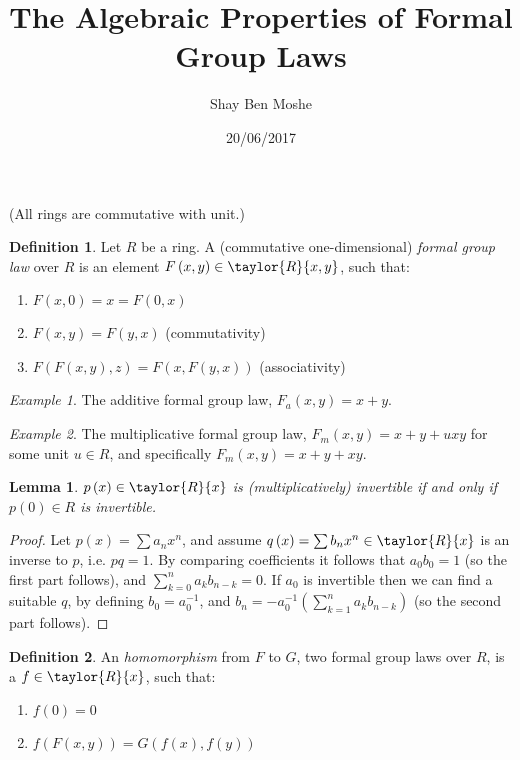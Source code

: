 \documentclass{article}
\title{The Algebraic Properties of Formal Group Laws}
\author{Shay Ben Moshe}
\date{20/06/2017}
\newtheorem*{lemma*}{Lemma}
\theoremstyle{definition}
\newtheorem*{definition*}{Definition}
\theoremstyle{remark}
\newtheorem*{example*}{Example}
\begin{document}
	\maketitle
	
	(All rings are commutative with unit.)
	
	\begin{definition*}
		Let $R$ be a ring.
		A (commutative one-dimensional) \emph{formal group law} over $R$ is an element $F\left(x,y\right) \in \taylor{R}{x,y}$, such that:
		\begin{enumerate}
			\item $F\left(x,0\right) = x = F\left(0,x\right)$
			\item $F\left(x,y\right)=F\left(y,x\right)$ (commutativity) 
			\item $F\left(F\left(x,y\right),z\right)=F\left(x,F\left(y,x\right)\right)$ (associativity)
		\end{enumerate}
	\end{definition*}

	\begin{example*}
		The additive formal group law, $F_a\left(x,y\right) = x+y$.
	\end{example*}

	\begin{example*}
		The multiplicative formal group law, $F_m\left(x,y\right) = x+y+uxy$ for some unit $u\in R$, and specifically $F_m\left(x,y\right) = x+y+xy$.
	\end{example*}

	\begin{lemma*}
		$p\left(x\right) \in \taylor{R}{x}$ is (multiplicatively) invertible if and only if $p\left(0\right) \in R$ is invertible.
	\end{lemma*}
	\begin{proof}
		Let $p\left(x\right) = \sum a_n x^n$, and assume $q\left(x\right) = \sum b_n x^n \in \taylor{R}{x}$ is an inverse to $p$, i.e. $pq = 1$. 
		By comparing coefficients it follows that $a_0 b_0 = 1$ (so the first part follows), and $\sum_{k=0}^n a_k b_{n-k} = 0$.
		If $a_0$ is invertible then we can find a suitable $q$, by defining $b_0 = a_0^{-1}$, and $b_n = - a_0^{-1} \left(\sum_{k=1}^n a_k b_{n-k}\right)$ (so the second part follows).
	\end{proof}

	\begin{definition*}
		An \emph{homomorphism} from $F$ to $G$, two formal group laws over $R$, is a $f \in \taylor{R}{x}$, such that:
		\begin{enumerate}
			\item $f\left(0\right) = 0$
			\item $f\left(F\left(x,y\right)\right) = G\left(f\left(x\right),f\left(y\right)\right)$
		\end{enumerate}
	\end{definition*}
\end{document}

